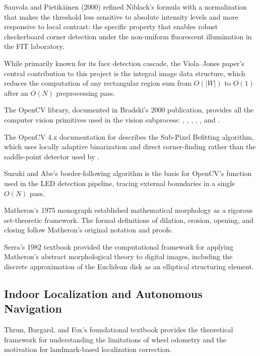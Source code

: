 \textbf{\cite{sauvola2000adaptive}} Sauvola and Pietik\"ainen (2000) refined Niblack's formula with a normalization that makes the threshold less sensitive to absolute intensity levels and more responsive to local contrast: the specific property that enables robust checkerboard corner detection under the non-uniform fluorescent illumination in the FIT laboratory.

\textbf{\cite{viola2001rapid}} While primarily known for its face detection cascade, the Viola--Jones paper's central contribution to this project is the integral image data structure, which reduces the computation of any rectangular region sum from $O(|W|)$ to $O(1)$ after an $O(N)$ preprocessing pass.

\textbf{\cite{bradski2000opencv}} The OpenCV library, documented in Bradski's 2000 publication, provides all the computer vision primitives used in the  vision subprocess: , , , , , and .

\textbf{\cite{opencv2023sb}} The OpenCV 4.x documentation for  describes the Sub-Pixel Befitting algorithm, which uses locally adaptive binarization and direct corner-finding rather than the saddle-point detector used by .

\textbf{\cite{suzuki1985topological}} Suzuki and Abe's border-following algorithm is the basis for OpenCV's  function used in the LED detection pipeline, tracing external boundaries in a single $O(N)$ pass.

\textbf{\cite{matheron1975random}} Matheron's 1975 monograph established mathematical morphology as a rigorous set-theoretic framework. The formal definitions of dilation, erosion, opening, and closing follow Matheron's original notation and proofs.

\textbf{\cite{serra1982image}} Serra's 1982 textbook provided the computational framework for applying Matheron's abstract morphological theory to digital images, including the discrete approximation of the Euclidean disk as an elliptical structuring element.

\subsection{Indoor Localization and Autonomous Navigation}

\textbf{\cite{thrun2005probabilistic}} Thrun, Burgard, and Fox's foundational textbook provides the theoretical framework for understanding the limitations of wheel odometry and the motivation for landmark-based localization correction.

